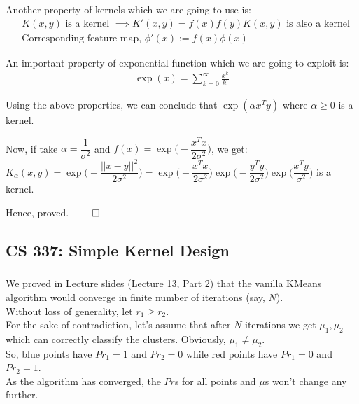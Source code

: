 \documentclass[12pt, fleqn]{article}
\begin{document}
Another property of kernels which we are going to use is:
\begin{equation*}
    \begin{aligned}
         & K(x, y) \text{ is a kernel } \implies K'(x, y) = f(x) f(y) K(x, y) \text{ is also a kernel} \\
         & \text{Corresponding feature map, } \phi'(x) := f(x) \phi(x)
    \end{aligned}
\end{equation*}


An important property of exponential function which we are going to exploit is:
\begin{equation*}
    \begin{aligned}
        \exp(x) = \sum_{k=0}^{\infty} \frac{x^k}{k!}
    \end{aligned}
\end{equation*}

Using the above properties, we can conclude that $\exp(\alpha x^T y)$ where $\alpha \ge 0$ is a kernel.

Now, if take $\alpha = \dfrac{1}{\sigma^2}$ and $f(x) = \exp\bigg(- \dfrac{x^T x}{2 \sigma^2}\bigg)$, we get: \\
$K_\alpha (x, y) = \exp\bigg(- \dfrac{||x - y||^2}{2 \sigma^2}\bigg) = \exp\bigg(- \dfrac{x^T x}{2 \sigma^2}\bigg) \exp\bigg(- \dfrac{y^T y}{2 \sigma^2}\bigg) \exp\bigg(\dfrac{x^T y}{\sigma^2}\bigg)$ is a kernel.

Hence, proved. \hfill $\qed$


\subsection{CS 337: Simple Kernel Design}
\subsubsection{}
We proved in Lecture slides (Lecture 13, Part 2) that the vanilla KMeans algorithm would converge in finite number of iterations (say, $N$). \\
Without loss of generality, let $r_1 \ge r_2$. \\
For the sake of contradiction, let's assume that after $N$ iterations we get ${\mu_1, \mu_2}$ which can correctly classify the clusters. Obviously, $\mu_1 \neq \mu_2$. \\
So, blue points have $Pr_1 = 1$ and $Pr_2 = 0$ while red points have $Pr_1 = 0$ and $Pr_2 = 1$. \\
As the algorithm has converged, the $Pr$s for all points and $\mu$s won't change any further. \\
\end{document}
